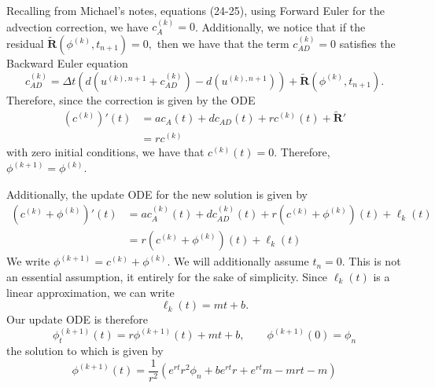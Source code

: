 \documentclass[12pt]{article}
\begin{document}
\noindent

Recalling from Michael's notes, equations (24-25), using Forward Euler for the 
advection correction, we have $c^{(k)}_A = 0$. 
Additionally, we notice that if the residual 
$\bm{\tilde R}(\phi^{(k)},t_{n+1}) = 0,$ then we have that the term 
$c^{(k)}_{AD} = 0$ satisfies the Backward Euler equation
\begin{equation}
   c_{AD}^{(k)} = \Delta t\left(d(u^{(k),n+1} + c_{AD}^{(k)}) 
                              - d(u^{(k),n+1})\right)
                  + \bm{\tilde R}(\phi^{(k)},t_{n+1}).
\end{equation}
Therefore, since the correction is given by the ODE
\begin{align}
   (c^{(k)})'(t) &= ac_A(t) + dc_{AD}(t) + rc^{(k)}(t) + \bm{\tilde R}'\\
                 &= rc^{(k)}
\end{align}
with zero initial conditions, we have that $c^{(k)}(t) = 0$. Therefore, 
$\phi^{(k+1)} = \phi^{(k)}$.

Additionally, the update ODE for the new solution is given by
\begin{align}
   (c^{(k)} + \phi^{(k)})'(t) &= ac^{(k)}_A(t) + dc^{(k)}_{AD}(t) 
                                 + r(c^{(k)} + \phi^{(k)})(t)
                                 + \ell_k(t)\\
                              &= r(c^{(k)} + \phi^{(k)})(t) + \ell_k(t)
\end{align}
We write $\phi^{(k+1)} = c^{(k)} + \phi^{(k)}$. We will additionally assume 
$t_n = 0$. This is not an essential assumption, it entirely for the sake of 
simplicity. Since $\ell_k(t)$ is a linear approximation, we can write
\begin{equation}
   \ell_k(t) = mt + b.
\end{equation}
Our update ODE is therefore
\begin{equation}
   \phi^{(k+1)}_t(t) = r\phi^{(k+1)}(t) + mt + b, \qquad \phi^{(k+1)}(0) = \phi_n
\end{equation}
the solution to which is given by
\begin{equation}
   \label{ode-soln}
   \phi^{(k+1)}(t) = \frac{1}{r^2}\left(
      e^{rt}r^2 \phi_n + be^{rt}r + e^{rt}m -mrt - m
   \right)
\end{equation}
\end{document}

